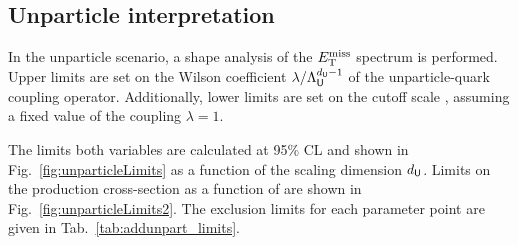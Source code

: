 \clearpage
\subsection{Unparticle interpretation}
In the unparticle scenario, a shape analysis of the $E_\mathrm{T}^{\mathrm{miss}}$ spectrum is performed.
Upper limits are set on the Wilson coefficient $\lambda / \Lambda_{\textsf{U}}^{d_{\textsf{U}}-1}$ of the unparticle-quark coupling operator.
Additionally, lower limits are set on the cutoff scale \LU, assuming a fixed value of the coupling $\lambda=1$.

The limits both variables are calculated at 95\% CL and shown in Fig.~\ref{fig:unparticleLimits} as a function of the scaling dimension $d_{\textsf U}$.
Limits on the production cross-section as a function of \dU are shown in Fig.~\ref{fig:unparticleLimits2}.
The exclusion limits for each parameter point are given in Tab.~\ref{tab:addunpart_limits}.


